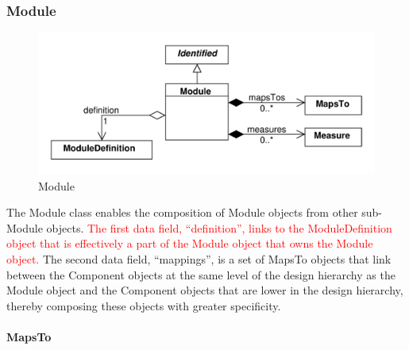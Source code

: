 \documentclass[draftspec]{sbmlpkgspec}
\begin{document}
\subsubsection{Module}
\label{sec:Module}

\begin{figure}[ht]
\begin{center}
\includegraphics[scale=0.6]{uml/module}
\caption[]{Module}
\label{uml:module}
\end{center}
\end{figure}

The Module class enables the composition of Module objects from other sub-Module objects. \textcolor{red}{The first data field, “definition”, links to the ModuleDefinition object that is effectively a part of the Module object that owns the Module object.} The second data field, “mappings”, is a set of MapsTo objects that link between the Component objects at the same level of the design hierarchy as the Module object and the Component objects that are lower in the design hierarchy, thereby composing these objects with greater specificity.




\paragraph{MapsTo}
\label{sec:MapsTo}
\end{document}

